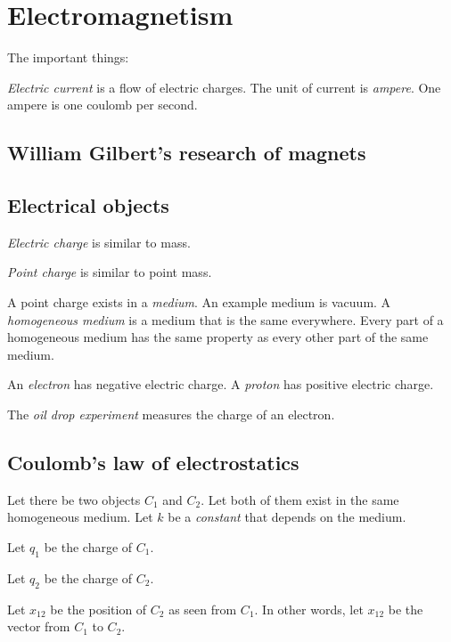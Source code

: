 \chapter{Electromagnetism}

The important things:

\emph{Electric current} is a flow of electric charges.
The unit of current is \emph{ampere}.
One ampere is one coulomb per second.

\section{William Gilbert's research of magnets}

\section{Electrical objects}

\emph{Electric charge} is similar to mass.

\emph{Point charge} is similar to point mass.

A point charge exists in a \emph{medium}.
An example medium is vacuum.
A \emph{homogeneous medium} is a medium that is the same everywhere.
Every part of a homogeneous medium has the same property as every other part of the same medium.

An \emph{electron} has negative electric charge.
A \emph{proton} has positive electric charge.

The \emph{oil drop experiment} measures the charge of an electron.

\section{Coulomb's law of electrostatics}

Let there be two objects \(C_1\) and \(C_2\).
Let both of them exist in the same homogeneous medium.
Let \( k \) be a \emph{constant} that depends on the medium.

Let \( q_1 \) be the charge of \(C_1\).

Let \( q_2 \) be the charge of \(C_2\).

Let \( x_{12} \) be the position of \(C_2\) as seen from \(C_1\).
In other words, let \( x_{12} \) be the vector from \(C_1\) to \(C_2\).

